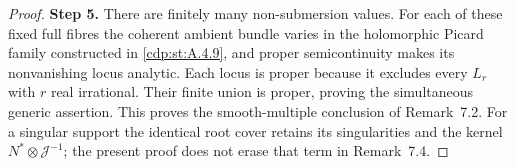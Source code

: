 \begin{proof}
\noindent\textbf{Step 5.} There are finitely many non-submersion values. For each of these fixed full fibres the coherent ambient bundle varies in the holomorphic Picard family constructed in \ref{cdp:st:A.4.9}, and proper semicontinuity makes its nonvanishing locus analytic. Each locus is proper because it excludes every $L_r$ with $r$ real irrational. Their finite union is proper, proving the simultaneous generic assertion. This proves the smooth-multiple conclusion of Remark~7.2. For a singular support the identical root cover retains its singularities and the kernel $N^*\otimes\mathcal J^{-1}$; the present proof does not erase that term in Remark~7.4.
\end{proof}

